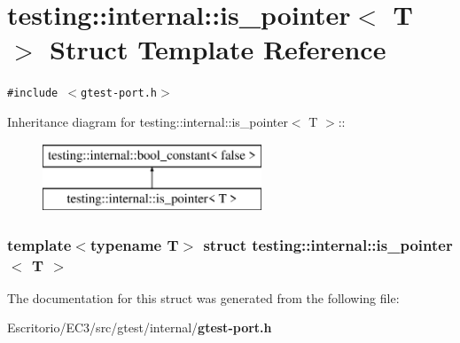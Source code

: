 \section{testing::internal::is\_\-pointer$<$ T $>$ Struct Template Reference}
\label{structtesting_1_1internal_1_1is__pointer}
{\tt \#include $<$gtest-port.h$>$}

Inheritance diagram for testing::internal::is\_\-pointer$<$ T $>$::\begin{figure}[H]
\begin{center}
\leavevmode
\includegraphics[height=2cm]{structtesting_1_1internal_1_1is__pointer}
\end{center}
\end{figure}
\subsubsection*{template$<$typename T$>$ struct testing::internal::is\_\-pointer$<$ T $>$}



The documentation for this struct was generated from the following file:\begin{CompactItemize}
\item 
Escritorio/EC3/src/gtest/internal/{\bf gtest-port.h}\end{CompactItemize}
